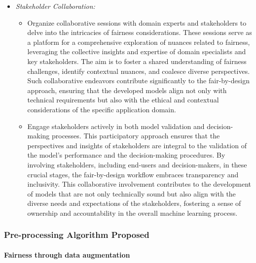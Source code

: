 \begin{itemize}
    
    \item \emph{Stakeholder Collaboration:}
    
    \begin{itemize}
    
        \item Organize collaborative sessions with domain experts and stakeholders to delve into the intricacies of fairness considerations. These sessions serve as a platform for a comprehensive exploration of nuances related to fairness, leveraging the collective insights and expertise of domain specialists and key stakeholders. The aim is to foster a shared understanding of fairness challenges, identify contextual nuances, and coalesce diverse perspectives. Such collaborative endeavors contribute significantly to the fair-by-design approach, ensuring that the developed models align not only with technical requirements but also with the ethical and contextual considerations of the specific application domain.
    
        
        \item Engage stakeholders actively in both model validation and decision-making processes. This participatory approach ensures that the perspectives and insights of stakeholders are integral to the validation of the model's performance and the decision-making procedures. By involving stakeholders, including end-users and decision-makers, in these crucial stages, the fair-by-design workflow embraces transparency and inclusivity. This collaborative involvement contributes to the development of models that are not only technically sound but also align with the diverse needs and expectations of the stakeholders, fostering a sense of ownership and accountability in the overall machine learning process.
    
    \end{itemize}

\end{itemize}

\subsubsection{Pre-processing Algorithm Proposed}

\paragraph{Fairness through data augmentation}
\label{subsec:ftdr}

